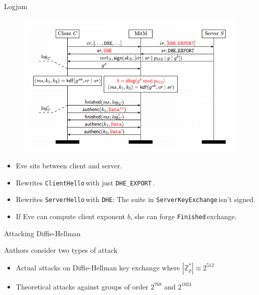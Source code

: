 \documentclass[presentation, aspectratio=54]{beamer}
\newcommand{\dhe}{\texttt{DHE}}
\newcommand{\dheexport}{\texttt{DHE\_EXPORT}\,}
\newcommand{\clienthello}{\texttt{ClientHello}\,}
\newcommand{\serverhello}{\texttt{ServerHello}\,}
\newcommand{\serverkex}{\texttt{ServerKeyExchange}\,}
\newcommand{\finished}{\texttt{Finished}\,}
\begin{document}
\begin{frame}{Logjam}

\begin{figure}
\centering
\includegraphics[width=0.6\columnwidth]{graphics/logjam.png}
\end{figure}

\begin{itemize}
\item Eve sits between client and server.
\item Rewrites \clienthello with just \dheexport.
\item Rewrites \serverhello with \dhe: The suite in \serverkex isn't signed.
\item If Eve can compute client exponent $b$, she can forge \finished exchange.
\end{itemize}

\end{frame}


\begin{frame}{Attacking Diffie-Hellman}

Authors consider two types of attack
\begin{itemize}
\item Actual attacks on Diffie-Hellman key exchange where
      $|\mathbb{Z}_p^*| \approx 2^{512}$
\item Theoretical attacks against groups of order $2^{768}$ and $2^{1024}$
\end{itemize}
    
\end{frame}

\end{document}
